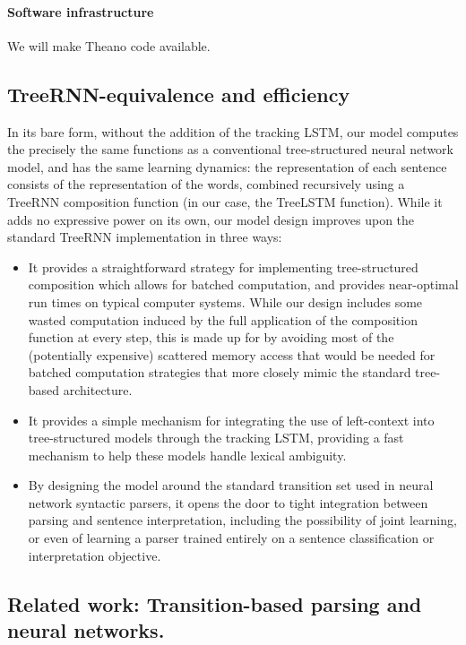 \documentclass[11pt,letterpaper]{article}
\begin{document}
\paragraph{Software infrastructure} We will make Theano code available.

\subsection{TreeRNN-equivalence and efficiency}

In its bare form, without the addition of the tracking LSTM, our model computes the precisely the same functions as a conventional tree-structured neural network model, and has the same learning dynamics: the representation of each sentence consists of the representation of the words, combined recursively using a TreeRNN composition function (in our case, the TreeLSTM function). While it adds no expressive power on its own, our model design improves upon the standard TreeRNN implementation in three ways:

\begin{itemize}
\item It provides a straightforward strategy for implementing tree-structured composition which allows for batched computation, and provides near-optimal run times on typical computer systems. While our design includes some wasted computation induced by the full application of the composition function at every step, this is made up for by avoiding most of the (potentially expensive) scattered memory access that would be needed for batched computation strategies that more closely mimic the standard tree-based architecture.

\item It provides a simple mechanism for integrating the use of left-context into tree-structured models through the tracking LSTM, providing a fast mechanism to help these models handle lexical ambiguity.

\item By designing the model around the standard transition set used in neural network syntactic parsers, it opens the door to tight integration between parsing and sentence interpretation, including the possibility of joint learning, or even of learning a parser trained entirely on a sentence classification or interpretation objective.
\end{itemize}

\subsection{Related work: Transition-based parsing and neural networks.}
\end{document}
